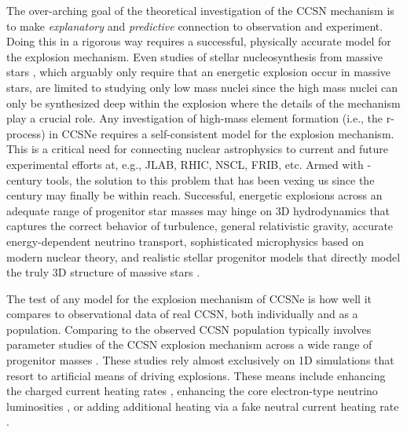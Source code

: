 The over-arching goal of the theoretical investigation of the CCSN mechanism is to make {\it explanatory} and {\it predictive} connection to observation and experiment.
Doing this in a rigorous way requires a successful, physically accurate model for the explosion mechanism.
Even studies of stellar nucleosynthesis from massive stars \citep[e.g.,][]{Woosley:1995, Woosley:2007d}, which arguably only require that an energetic explosion occur in massive stars, are limited to studying only low mass nuclei since the high mass nuclei can only be synthesized deep within the explosion where the details of the mechanism play a crucial role.
Any investigation of high-mass element formation (i.e., the r-process) in CCSNe requires a self-consistent model for the explosion mechanism.
This is a critical need for connecting nuclear astrophysics to current and future experimental efforts at, e.g., JLAB, RHIC, NSCL, FRIB, etc.
Armed with -century tools, the solution to this problem that has been vexing us since the  century may finally be within reach.
Successful, energetic explosions across an adequate range of progenitor star masses may hinge on 3D hydrodynamics that captures the correct behavior of turbulence, general relativistic gravity, accurate energy-dependent neutrino transport, sophisticated microphysics based on modern nuclear theory, and realistic stellar progenitor models that directly model the truly 3D structure of massive stars \citep[e.g.,][]{Meakin:2007, Arnett:2011, Couch:2015a}.

The test of any model for the explosion mechanism of CCSNe is how well it compares to observational data of real CCSN, both individually and as a population.
Comparing to the observed CCSN population typically involves parameter studies of the CCSN explosion mechanism across a wide range of progenitor masses \citep[e.g.,][]{OConnor:2011, Ugliano:2012, Oconnor:2013, Ertl:2015, Sukhbold:2015, Perego:2015}.
These studies rely almost exclusively on 1D simulations that resort to artificial means of driving explosions.
These means include enhancing the charged current heating rates \citep{OConnor:2011}, enhancing the core electron-type neutrino luminosities \citep{Ugliano:2012, Ertl:2015, Sukhbold:2015}, or adding additional heating via a fake neutral current heating rate \citep{Perego:2015}.


